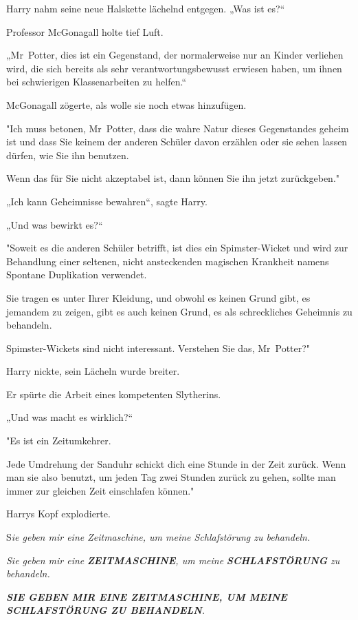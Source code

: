 {Harry nahm seine neue Halskette lächelnd entgegen. „Was ist es?“

Professor McGonagall holte tief Luft.

„Mr~Potter, dies ist ein Gegenstand, der normalerweise nur an Kinder verliehen wird, die sich bereits als sehr verantwortungsbewusst erwiesen haben, um ihnen bei schwierigen Klassenarbeiten zu helfen.“

McGonagall zögerte, als wolle sie noch etwas hinzufügen.

"Ich muss betonen, Mr~Potter, dass die wahre Natur dieses Gegenstandes geheim ist und dass Sie keinem der anderen Schüler davon erzählen oder sie sehen lassen dürfen, wie Sie ihn benutzen.

Wenn das für Sie nicht akzeptabel ist, dann können Sie ihn jetzt zurückgeben."

„Ich kann Geheimnisse bewahren“, sagte Harry.

„Und was bewirkt es?“

"Soweit es die anderen Schüler betrifft, ist dies ein Spimster-Wicket und wird zur Behandlung einer seltenen, nicht ansteckenden magischen Krankheit namens Spontane Duplikation verwendet.

Sie tragen es unter Ihrer Kleidung, und obwohl es keinen Grund gibt, es jemandem zu zeigen, gibt es auch keinen Grund, es als schreckliches Geheimnis zu behandeln.

Spimster-Wickets sind nicht interessant. Verstehen Sie das, Mr~Potter?"

Harry nickte, sein Lächeln wurde breiter.

Er spürte die Arbeit eines kompetenten Slytherins.

„Und was macht es wirklich?“

"Es ist ein Zeitumkehrer.

Jede Umdrehung der Sanduhr schickt dich eine Stunde in der Zeit zurück. Wenn man sie also benutzt, um jeden Tag zwei Stunden zurück zu gehen, sollte man immer zur gleichen Zeit einschlafen können."

Harrys Kopf explodierte.

S\emph{ie geben mir eine Zeitmaschine, um meine Schlafstörung zu behandeln.}

\emph{Sie geben mir eine} \textbf{\emph{ZEITMASCHINE}}\emph{, um meine} \textbf{\emph{SCHLAFSTÖRUNG}} \emph{zu behandeln.}

\emph{\hfill\break }\textbf{\emph{SIE GEBEN MIR EINE ZEITMASCHINE, UM MEINE SCHLAFSTÖRUNG ZU BEHANDELN}}\emph{.}

}
